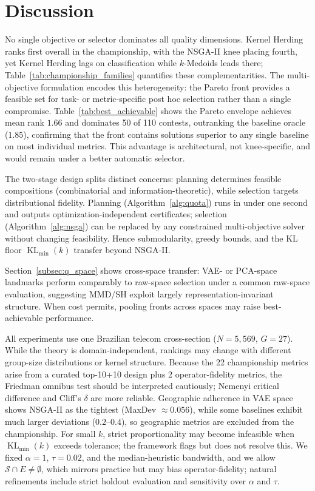 \documentclass[10pt,journal]{IEEEtran}
\newcommand{\datasetN}{5{,}569}
\newcommand{\1}{\mathbf{1}}
\newcommand{\Sel}{\mathcal{S}}
\DeclareMathOperator{\KL}{KL}
\theoremstyle{ieeethm}
\begin{document}
\section{Discussion}
\label{sec:discussion}

No single objective or selector dominates all quality dimensions. Kernel Herding ranks first overall in the championship, with the NSGA-II knee placing fourth, yet Kernel Herding lags on classification while $k$-Medoids leads there; Table~\ref{tab:championship_families} quantifies these complementarities. The multi-objective formulation encodes this heterogeneity: the Pareto front provides a feasible set for task- or metric-specific post hoc selection rather than a single compromise. Table~\ref{tab:best_achievable} shows the Pareto envelope achieves mean rank $1.66$ and dominates 50 of 110 contests, outranking the baseline oracle ($1.85$), confirming that the front contains solutions superior to any single baseline on most individual metrics. This advantage is architectural, not knee-specific, and would remain under a better automatic selector.

The two-stage design splits distinct concerns: planning determines feasible compositions (combinatorial and information-theoretic), while selection targets distributional fidelity. Planning (Algorithm~\ref{alg:quota}) runs in under one second and outputs optimization-independent certificates; selection (Algorithm~\ref{alg:nsga}) can be replaced by any constrained multi-objective solver without changing feasibility. Hence submodularity, greedy bounds, and the KL floor $\KL_{\min}(k)$ transfer beyond NSGA-II.

Section~\ref{subsec:q_space} shows cross-space transfer: VAE- or PCA-space landmarks perform comparably to raw-space selection under a common raw-space evaluation, suggesting MMD/SH exploit largely representation-invariant structure. When cost permits, pooling fronts across spaces may raise best-achievable performance.

All experiments use one Brazilian telecom cross-section ($N{=}\datasetN$, $G{=}27$). While the theory is domain-independent, rankings may change with different group-size distributions or kernel structure. Because the 22 championship metrics arise from a curated top-10+10 design plus 2 operator-fidelity metrics, the Friedman omnibus test should be interpreted cautiously; Nemenyi critical difference and Cliff's $\delta$ are more reliable. Geographic adherence in VAE space shows NSGA-II as the tightest (MaxDev $\approx 0.056$), while some baselines exhibit much larger deviations ($0.2$--$0.4$), so geographic metrics are excluded from the championship. For small $k$, strict proportionality may become infeasible when $\KL_{\min}(k)$ exceeds tolerance; the framework flags but does not resolve this. We fixed $\alpha{=}1$, $\tau{=}0.02$, and the median-heuristic bandwidth, and we allow $\Sel\cap E \neq \emptyset$, which mirrors practice but may bias operator-fidelity; natural refinements include strict holdout evaluation and sensitivity over $\alpha$ and $\tau$.
\end{document}
